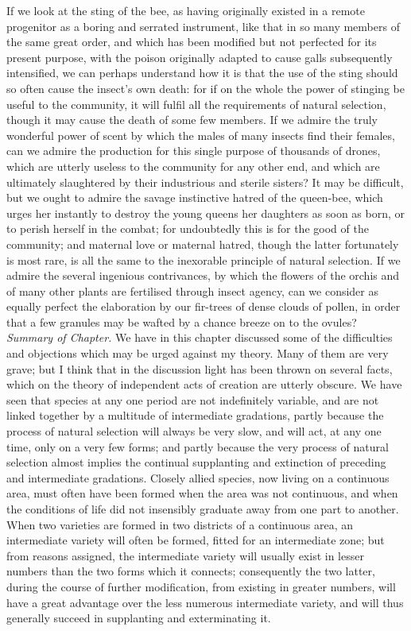 \indent If we look at the sting of the bee, as having originally existed in a remote progenitor as a boring and serrated instrument, like that in so many members of the same great order, and which has been modified but not perfected for its present purpose, with the poison originally adapted to cause galls subsequently intensified, we can perhaps understand how it is that the use of the sting should so often cause the insect's own death: for if on the whole the power of stinging be useful to the community, it will fulfil all the requirements of natural selection, though it may cause the death of some few members. If we admire the truly wonderful power of scent by which the males of many insects find their females, can we admire the production for this single purpose of thousands of drones, which are utterly useless to the community for any other end, and which are ultimately slaughtered by their industrious and sterile sisters? It may be difficult, but we ought to admire the savage instinctive hatred of the queen-bee, which urges her instantly to destroy the young queens her daughters as soon as born, or to perish herself in the combat; for undoubtedly this is for the good of the community; and maternal love or maternal hatred, though the latter fortunately is most rare, is all the same to the inexorable principle of natural selection. If we admire the several ingenious contrivances, by which the flowers of the orchis and of many other plants are fertilised through insect agency, can we consider as equally perfect the elaboration by our fir-trees of dense clouds of pollen, in order that a few granules may be wafted by a chance breeze on to the ovules?\\
\indent \emph{Summary of Chapter.} We have in this chapter discussed some of the difficulties and objections which may be urged against my theory. Many of them are very grave; but I think that in the discussion light has been thrown on several facts, which on the theory of independent acts of creation are utterly obscure. We have seen that species at any one period are not indefinitely variable, and are not linked together by a multitude of intermediate gradations, partly because the process of natural selection will always be very slow, and will act, at any one time, only on a very few forms; and partly because the very process of natural selection almost implies the continual supplanting and extinction of preceding and intermediate gradations. Closely allied species, now living on a continuous area, must often have been formed when the area was not continuous, and when the conditions of life did not insensibly graduate away from one part to another. When two varieties are formed in two districts of a continuous area, an intermediate variety will often be formed, fitted for an intermediate zone; but from reasons assigned, the intermediate variety will usually exist in lesser numbers than the two forms which it connects; consequently the two latter, during the course of further modification, from existing in greater numbers, will have a great advantage over the less numerous intermediate variety, and will thus generally succeed in supplanting and exterminating it.\\
